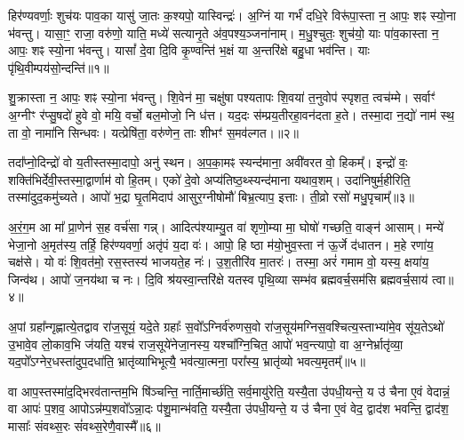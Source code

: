 \setcounter{anuvakam}{0}
हिर॑ण्यवर्णाः॒ शुच॑यः पाव॒का यासु॑ जा॒तः क॒श्यपो॒ यास्विन्द्रः॑। अ॒ग्निं या गर्भं॑ दधि॒रे विरू॑पा॒स्ता न॒ आपः॒ शꣴ स्यो॒ना भ॑वन्तु। यासा॒ꣳ॒ राजा॒ वरु॑णो॒ याति॒ मध्ये॑ सत्यानृ॒ते अ॑व॒पश्य॒ञ्जना॑नाम्। म॒धु॒श्चुतः॒ शुच॑यो॒ याः पा॑व॒कास्ता न॒ आपः॒ शꣴ स्यो॒ना भ॑वन्तु। यासां᳚ दे॒वा दि॒वि कृ॒ण्वन्ति॑ भ॒क्षं या अ॒न्तरि॑क्षे बहु॒धा भव॑न्ति। याः पृ॑थि॒वीम्पय॑सो॒न्दन्ति॑॥१॥

शु॒क्रास्ता न॒ आपः॒ शꣴ स्यो॒ना भ॑वन्तु। शि॒वेन॑ मा॒ चक्षु॑षा पश्यतापः शि॒वया॑ त॒नुवोप॑ स्पृशत॒ त्वच॑म्मे। सर्वाꣳ॑ अ॒ग्नीꣳ र॑प्सु॒षदो॑ हुवे वो॒ मयि॒ वर्चो॒ बल॒मोजो॒ नि ध॑त्त। यद॒दः स॑म्प्रय॒तीरहा॒वन॑दता ह॒ते। तस्मा॒दा न॒द्यो॑ नाम॑ स्थ॒ ता वो॒ नामा॑नि सिन्धवः। यत्प्रेषि॑ता॒ वरु॑णेन॒ ताः शीभꣳ॑ स॒मव॑ल्गत।॥२॥

तदा᳚प्नो॒दिन्द्रो॑ वो य॒तीस्तस्मा॒दापो॒ अनु॑ स्थन। अ॒प॒का॒मꣴ स्यन्द॑माना॒ अवी॑वरत वो॒ हिकम्᳚। इन्द्रो॑ वः॒ शक्ति॑भिर्देवी॒स्तस्मा॒द्वार्णाम॑ वो हि॒तम्। एको॑ दे॒वो अप्य॑तिष्ठ॒थ्स्यन्द॑माना यथाव॒शम्। उदा॑निषुर्म॒हीरिति॒ तस्मा॑दुद॒कमु॑च्यते। आपो॑ भ॒द्रा घृ॒तमिदाप॑ आसुर॒ग्नीषोमौ॑ बिभ्र॒त्याप॒ इत्ताः। ती॒व्रो रसो॑ मधु॒पृचाम्᳚॥३॥

अ॒रं॒ग॒म आ मा᳚ प्रा॒णेन॑ स॒ह वर्च॑सा गन्न्। आदित्प॑श्याम्यु॒त वा॑ शृणो॒म्या मा॒ घोषो॑ गच्छति॒ वाङ्न॑ आसाम्। मन्ये॑ भेजा॒नो अ॒मृत॑स्य॒ तर्\mbox{}हि॒ हिर॑ण्यवर्णा॒ अतृ॑पं य॒दा वः॑। आपो॒ हि ष्ठा म॑यो॒भुव॒स्ता न॑ ऊ॒र्जे द॑धातन। म॒हे रणा॑य॒ चक्ष॑से। यो वः॑ शि॒वत॑मो॒ रस॒स्तस्य॑ भाजयते॒ह नः॑। उ॒श॒तीरि॑व मा॒तरः॑। तस्मा॒ अरं॑ गमाम वो॒ यस्य॒ क्षया॑य॒ जिन्व॑थ। आपो॑ ज॒नय॑था च नः। दि॒वि श्र॑यस्वा॒न्तरि॑क्षे यतस्व पृथि॒व्या सम्भ॑व ब्रह्मवर्च॒सम॑सि ब्रह्मवर्च॒साय॑ त्वा॥४॥

{\anuvakamend[{उ॒न्दन्ति॑ स॒मव॑ल्गत मधु॒पृचा᳚म्मा॒तरो॒ द्वाविꣳ॑शतिश्च॥१॥}]}

अ॒पां ग्रहा᳚न्गृह्णात्ये॒तद्वाव रा॑ज॒सूयं॒ यदे॒ते ग्रहाः᳚ स॒वो᳚\-ऽग्निर्व॑रुणस॒वो रा॑ज॒सूय॑मग्निस॒वश्चित्य॒स्ताभ्या॑मे॒व सू॑य॒ते\-ऽथो॑ उ॒भावे॒व लो॒काव॒भि ज॑यति॒ यश्च॑ राज॒सूये॑नेजा॒नस्य॒ यश्चा᳚ग्नि॒चित॒ आपो॑ भव॒न्त्यापो॒ वा अ॒ग्नेर्भ्रातृ॑व्या॒ यद॒पो᳚\-ऽग्नेर॒धस्ता॑दुप॒दधा॑ति॒ भ्रातृ॑व्याभिभूत्यै॒ भव॑त्या॒त्मना॒ परा᳚स्य॒ भ्रातृ॑व्यो भवत्य॒मृतम्᳚॥५॥

वा आप॒स्तस्मा॑द॒द्भिरव॑तान्तम॒भि षि॑ञ्चन्ति॒ नार्ति॒मार्च्छ॑ति॒ सर्व॒मायु॑रेति॒ यस्यै॒ता उ॑पधी॒यन्ते॒ य उ॑ चैना ए॒वं वेदान्नं॒ वा आपः॑ प॒शव॒ आपो\-ऽन्न॑म्प॒शवो᳚\-ऽन्ना॒दः प॑शु॒मान्भ॑वति॒ यस्यै॒ता उ॑पधी॒यन्ते॒ य उ॑ चैना ए॒वं वेद॒ द्वाद॑श भवन्ति॒ द्वाद॑श॒ मासाः᳚ संवथ्स॒रः सं॑वथ्स॒रेणै॒वास्मै᳚॥६॥

